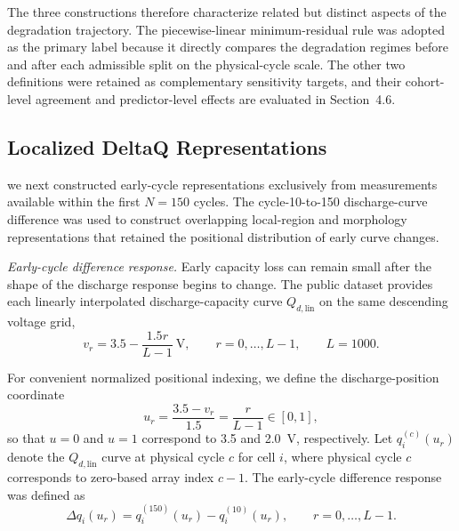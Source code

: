 \documentclass[pdflatex,sn-mathphys-num]{sn-jnl}
\begin{document}
The three constructions therefore characterize related but distinct aspects of the degradation trajectory. The piecewise-linear minimum-residual rule was adopted as the primary label because it directly compares the degradation regimes before and after each admissible split on the physical-cycle scale. The other two definitions were retained as complementary sensitivity targets, and their cohort-level agreement and predictor-level effects are evaluated in Section~4.6.

\subsection{Localized DeltaQ Representations}
\label{subsec:local_deltaq}

\begingroup
\setlength{\abovedisplayskip}{7pt plus 2pt minus 2pt}
\setlength{\belowdisplayskip}{7pt plus 2pt minus 2pt}
\setlength{\abovedisplayshortskip}{5pt plus 2pt minus 1pt}
\setlength{\belowdisplayshortskip}{5pt plus 2pt minus 1pt}

we next constructed early-cycle representations exclusively from measurements available within the first $N=150$ cycles. The cycle-10-to-150 discharge-curve difference was used to construct overlapping local-region and morphology representations that retained the positional distribution of early curve changes.

\noindent\textit{Early-cycle difference response.}
Early capacity loss can remain small after the shape of the discharge response begins to change. The public dataset provides each linearly interpolated discharge-capacity curve $Q_{d,\mathrm{lin}}$ on the same descending voltage
grid,
\begin{equation}
v_r
=
3.5-\frac{1.5r}{L-1}\ \mathrm{V},
\qquad
r=0,\ldots,L-1,
\qquad
L=1000.
\end{equation}

For convenient normalized positional indexing, we define the discharge-position coordinate
\begin{equation}
u_r
=
\frac{3.5-v_r}{1.5}
=
\frac{r}{L-1}
\in[0,1],
\end{equation}
so that $u=0$ and $u=1$ correspond to 3.5 and 2.0~V, respectively. Let $q_i^{(c)}(u_r)$ denote the $Q_{d,\mathrm{lin}}$ curve at physical cycle $c$ for cell $i$, where physical cycle $c$ corresponds to zero-based
array index $c-1$. The early-cycle difference response was defined as
\begin{equation}
\Delta q_i(u_r)
=
q_i^{(150)}(u_r)-q_i^{(10)}(u_r),
\qquad
r=0,\ldots,L-1.
\end{equation}
\end{document}
